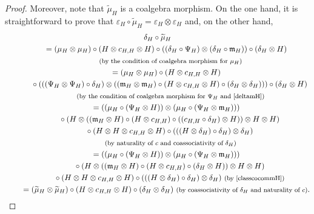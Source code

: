 \documentclass[pdftex]{sigma}
\numberwithin{equation}{section}
\begin{document}
\begin{proof}
Moreover, note that $\widetilde{\mu}_{H}$ is a coalgebra morphism. On the one hand, it is straightforward to prove that $\varepsilon_{H}\circ\widetilde{\mu}_{H}=\varepsilon_{H}\otimes\varepsilon_{H}$ and, on the other hand,
\begin{gather*}
\delta_{H}\circ\widetilde{\mu}_{H}\\
\qquad{}=(\mu_{H}\otimes\mu_{H})\circ(H\otimes c_{H,H}\otimes H)\circ((\delta_{H}\circ\Psi_{H})\otimes(\delta_{H}\circ\mathfrak{m}_{H}))\circ(\delta_{H}\otimes H)\\
\qquad\quad{}\ \text{\footnotesize\textnormal{(by the condition of coalgebra morphism for $\mu_{H}$)}}\\
\qquad{}=(\mu_{H}\otimes\mu_{H})\circ(H\otimes c_{H,H}\otimes H)\\
\qquad\quad{}\circ(((\Psi_{H}\otimes\Psi_{H})\circ\delta_{H})\otimes((\mathfrak{m}_{H}\otimes\mathfrak{m}_{H})\circ(H\otimes c_{H,H}\otimes H)
\circ(\delta_{H}\otimes\delta_{H})))\circ(\delta_{H}\otimes H)\\
\qquad\quad{}\ \text{\footnotesize\textnormal{(by the condition of coalgebra morphism for $\Psi_{H}$ and \eqref{deltamH})}}\\
\qquad{}=((\mu_{H}\circ(\Psi_{H}\otimes H))\otimes(\mu_{H}\circ(\Psi_{H}\otimes\mathfrak{m}_{H})))\\
\qquad\quad{}\circ(H\otimes((\mathfrak{m}_{H}\otimes H)\circ(H\otimes c_{H,H})\circ((c_{H,H}\circ\delta_{H})\otimes H))\otimes H\otimes H)\\
\qquad\quad{}\circ(H\otimes H\otimes c_{H,H}\otimes H)\circ(((H\otimes\delta_{H})\circ\delta_{H})\otimes\delta_{H})\\
\qquad\quad{}\ \text{\footnotesize\textnormal{(by naturality of $c$ and coassociativity of $\delta_{H}$)}}\\
\qquad{}=((\mu_{H}\circ(\Psi_{H}\otimes H))\otimes(\mu_{H}\circ(\Psi_{H}\otimes\mathfrak{m}_{H})))\\
\qquad\quad{}\circ(H\otimes((\mathfrak{m}_{H}\otimes H)\circ(H\otimes c_{H,H})\circ(\delta_{H}\otimes H))
\otimes H\otimes H)\\
\qquad\quad{}\circ(H\otimes H\otimes c_{H,H}\otimes H)\circ(((H\otimes\delta_{H})\circ\delta_{H})\otimes\delta_{H})\ \text{\footnotesize\textnormal{(by \eqref{classcocommH})}}\\
\qquad{}=(\widetilde{\mu}_{H}\otimes\widetilde{\mu}_{H})\circ(H\otimes c_{H,H}\otimes H)\circ(\delta_{H}\otimes\delta_{H})\ \text{\footnotesize\textnormal{(by coassociativity of $\delta_{H}$ and naturality of $c$)}}.
\end{gather*}


\end{proof}
\end{document}
